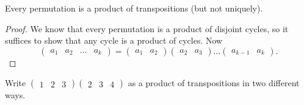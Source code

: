 \begin{proposition}
    Every permutation is a product of transpositions
    (but not uniquely).
\end{proposition}

\begin{proof}
    We know that every permutation is a product of disjoint
    cycles, so it suffices to show that any cycle is a product
    of cycles.
    Now
    \[
        \begin{pmatrix}
            a_1 & a_2 & \ldots & a_k
        \end{pmatrix}
        =
        \begin{pmatrix}
            a_1 & a_2
        \end{pmatrix}
        \begin{pmatrix}
            a_2 & a_3
        \end{pmatrix}
        \ldots
        \begin{pmatrix}
            a_{k-1} & a_k
        \end{pmatrix}
        .
    \]
\end{proof}

\begin{example}
    Write 
    $
        \begin{pmatrix}
            1 & 2 & 3
        \end{pmatrix}
        \begin{pmatrix}
            2 & 3 & 4
        \end{pmatrix}
    $
    as a product of transpositions in two different ways.
\end{example}

